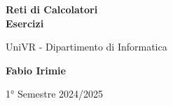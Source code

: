 \begin{titlepage}
	\begin{center}
		\vspace*{1cm}

		\Huge
		\textbf{Reti di Calcolatori\\Esercizi}

		\vspace{0.5cm}
		\LARGE
		UniVR - Dipartimento di Informatica

		\vspace{1.5cm}

		\textbf{Fabio Irimie}

		\vfill


		\vspace{0.8cm}


		1° Semestre 2024/2025

	\end{center}
\end{titlepage}
